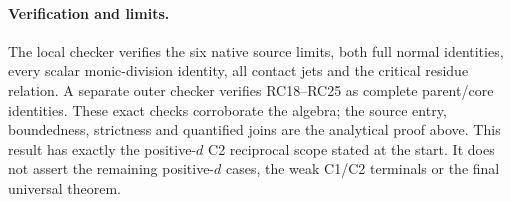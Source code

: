 \paragraph{Verification and limits.}
The local checker verifies the six native source limits, both full
normal identities, every scalar monic-division identity, all contact
jets and the critical residue relation. A separate outer checker
verifies RC18--RC25 as complete parent/core identities. These exact
checks corroborate the algebra; the source entry, boundedness,
strictness and quantified joins are the analytical proof above.
This result has exactly the positive-$d$ C2 reciprocal scope stated
at the start. It does not assert the remaining positive-$d$ cases,
the weak C1/C2 terminals or the final universal theorem.
